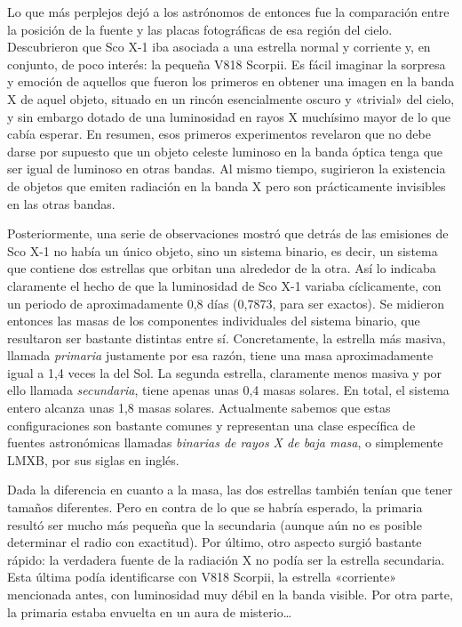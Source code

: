 Lo que más perplejos dejó a los astrónomos de entonces fue la comparación entre la posición de la fuente y las placas fotográficas de esa región del cielo. Descubrieron que Sco X-1 iba asociada a una estrella normal y corriente y, en conjunto, de poco interés: la pequeña V818 Scorpii. Es fácil imaginar la sorpresa y emoción de aquellos que fueron los primeros en obtener una imagen en la banda X de aquel objeto, situado en un rincón esencialmente oscuro y «trivial» del cielo, y sin embargo dotado de una luminosidad en rayos X muchísimo mayor de lo que cabía esperar. En resumen, esos primeros experimentos revelaron que no debe darse por supuesto que un objeto celeste luminoso en la banda óptica tenga que ser igual de luminoso en otras bandas. Al mismo tiempo, sugirieron la existencia de objetos que emiten radiación en la banda X pero son prácticamente invisibles en las otras bandas.

Posteriormente, una serie de observaciones mostró que detrás de las emisiones de Sco X-1 no había un único objeto, sino un sistema binario, es decir, un sistema que contiene dos estrellas que orbitan una alrededor de la otra. Así lo indicaba claramente el hecho de que la luminosidad de Sco X-1 variaba cíclicamente, con un periodo de aproximadamente 0,8 días (0,7873, para ser exactos). Se midieron entonces las masas de los componentes individuales del sistema binario, que resultaron ser bastante distintas entre sí. Concretamente, la estrella más masiva, llamada \emph{primaria} justamente por esa razón, tiene una masa aproximadamente igual a 1,4 veces la del Sol. La segunda estrella, claramente menos masiva y por ello llamada \emph{secundaria}, tiene apenas unas 0,4 masas solares. En total, el sistema entero alcanza unas 1,8 masas solares. Actualmente sabemos que estas configuraciones son bastante comunes y representan una clase específica de fuentes astronómicas llamadas \emph{binarias de rayos X de baja masa}, o simplemente LMXB, por sus siglas en inglés.

Dada la diferencia en cuanto a la masa, las dos estrellas también tenían que tener tamaños diferentes. Pero en contra de lo que se habría esperado, la primaria resultó ser mucho más pequeña que la secundaria (aunque aún no es posible determinar el radio con exactitud). Por último, otro aspecto surgió bastante rápido: la verdadera fuente de la radiación X no podía ser la estrella secundaria. Esta última podía identificarse con V818 Scorpii, la estrella «corriente» mencionada antes, con luminosidad muy débil en la banda visible. Por otra parte, la primaria estaba envuelta en un aura de misterio…

